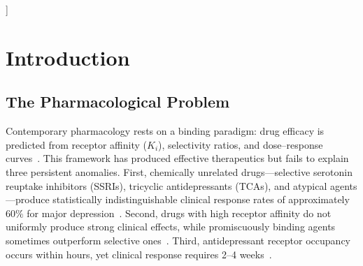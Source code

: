 \documentclass[twocolumn,10pt]{article}
\theoremstyle{remark}
\begin{document}
\begin{@twocolumnfalse}
\begin{abstract}
We extend the Neural Partition Language (NPL) with pharmacological primitives---aperture operations, regime transitions, frequency matching, and trajectory modification operators---grounded in the equations of state. The resulting pharmacological NPL (pNPL) expresses drug action as declarative constraint satisfaction: specify the target regime, and the partition structure determines the required trajectory. Experimental validation pathways include longitudinal EEG phase-locking value monitoring during antidepressant treatment, dose--response curves for structural factor modification, and real-time regime classification for pharmacological titration.

\vspace{6pt}
\noindent\textbf{Keywords:} pharmacological equations of state, categorical aperture, regime transition, Kuramoto synchronization, structural factor, variance minimization, neural partition language, drug action, phase-locking value, bounded phase space
  \end{abstract}
  \vspace{12pt}
  \end{@twocolumnfalse}
]

\section{Introduction}
\label{sec:intro}

\subsection{The Pharmacological Problem}

Contemporary pharmacology rests on a binding paradigm: drug efficacy is predicted from receptor affinity ($K_i$), selectivity ratios, and dose--response curves~\citep{kenakin2004principles}. This framework has produced effective therapeutics but fails to explain three persistent anomalies. First, chemically unrelated drugs---selective serotonin reuptake inhibitors (SSRIs), tricyclic antidepressants (TCAs), and atypical agents---produce statistically indistinguishable clinical response rates of approximately $60\%$ for major depression~\citep{cipriani2018comparative}. Second, drugs with high receptor affinity do not uniformly produce strong clinical effects, while promiscuously binding agents sometimes outperform selective ones~\citep{roth2004multiplicity}. Third, antidepressant receptor occupancy occurs within hours, yet clinical response requires 2--4 weeks~\citep{stahl2021essential}.
\end{document}
